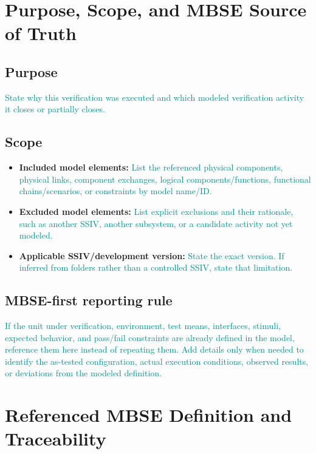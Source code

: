 \documentclass{../common/latex/delta_base_styles/delta_base_styles}
\newcommand{\placeholder}[1]{\textcolor{DarkCyan}{#1}}
\begin{document}
\section{Purpose, Scope, and MBSE Source of Truth}
\subsection{Purpose}
\placeholder{State why this verification was executed and which modeled verification activity it closes or partially closes.}

\subsection{Scope}
\begin{itemize}
  \item \textbf{Included model elements:} \placeholder{List the referenced physical components, physical links, component exchanges, logical components/functions, functional chains/scenarios, or constraints by model name/ID.}
  \item \textbf{Excluded model elements:} \placeholder{List explicit exclusions and their rationale, such as another SSIV, another subsystem, or a candidate activity not yet modeled.}
  \item \textbf{Applicable SSIV/development version:} \placeholder{State the exact version. If inferred from folders rather than a controlled SSIV, state that limitation.}
\end{itemize}

\subsection{MBSE-first reporting rule}
\placeholder{If the unit under verification, environment, test means, interfaces, stimuli, expected behavior, and pass/fail constraints are already defined in the model, reference them here instead of repeating them. Add details only when needed to identify the as-tested configuration, actual execution conditions, observed results, or deviations from the modeled definition.}

\section{Referenced MBSE Definition and Traceability}
\end{document}

